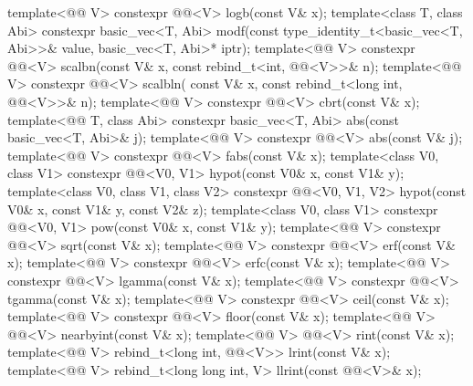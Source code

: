 \begin{codeblock}
{  template<@@ V> constexpr @@<V> logb(const V& x);
  template<class T, class Abi>
    constexpr basic_vec<T, Abi>
      modf(const type_identity_t<basic_vec<T, Abi>>& value, basic_vec<T, Abi>* iptr);
  template<@@ V>
    constexpr @@<V> scalbn(const V& x, const rebind_t<int, @@<V>>& n);
  template<@@ V>
    constexpr @@<V> scalbln(
      const V& x, const rebind_t<long int, @@<V>>& n);
  template<@@ V> constexpr @@<V> cbrt(const V& x);
  template<@@ T, class Abi>
    constexpr basic_vec<T, Abi> abs(const basic_vec<T, Abi>& j);
  template<@@ V> constexpr @@<V> abs(const V& j);
  template<@@ V> constexpr @@<V> fabs(const V& x);
  template<class V0, class V1>
    constexpr @@<V0, V1> hypot(const V0& x, const V1& y);
  template<class V0, class V1, class V2>
    constexpr @@<V0, V1, V2> hypot(const V0& x, const V1& y, const V2& z);
  template<class V0, class V1>
    constexpr @@<V0, V1> pow(const V0& x, const V1& y);
  template<@@ V> constexpr @@<V> sqrt(const V& x);
  template<@@ V> constexpr @@<V> erf(const V& x);
  template<@@ V> constexpr @@<V> erfc(const V& x);
  template<@@ V> constexpr @@<V> lgamma(const V& x);
  template<@@ V> constexpr @@<V> tgamma(const V& x);
  template<@@ V> constexpr @@<V> ceil(const V& x);
  template<@@ V> constexpr @@<V> floor(const V& x);
  template<@@ V> @@<V> nearbyint(const V& x);
  template<@@ V> @@<V> rint(const V& x);
  template<@@ V>
    rebind_t<long int, @@<V>> lrint(const V& x);
  template<@@ V>
    rebind_t<long long int, V> llrint(const @@<V>& x);
}
\end{codeblock}

